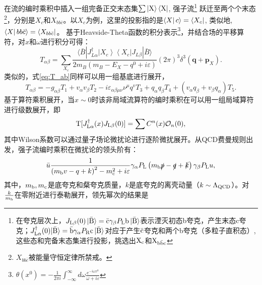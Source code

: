 在流的编时乘积中插入一组完备正交末态集$\mathrm{\sum\ket{X}\bra{X}}$, 强子流\footnote{在夸克层次上，$J_{\mathrm{L} \beta}(0)\ket{\mathrm{\bar{B}}}=\mathrm{\bar{c}} \gamma_\beta P_{\mathrm{L}} \mathrm{b\ket{\bar{B}}}$表示湮灭初态b夸克，产生末态c夸克；$J_{\mathrm{L} \alpha}^{\dagger}(0)\mathrm{\ket{\bar{B}}}=\mathrm{\bar{b}}\gamma_{\alpha}P_{\mathrm{R}}\mathrm{c\ket{\bar{B}}}$对应于产生$\mathrm{\bar{c}}$夸克和两个b夸克（多粒子直积态）,这些态和完备末态集进行投影，挑选出$\mathrm{X_{c}}$和$\mathrm{X_{b\bar{b}c}}$}
    跃迁至两个个末态\footnote{$X_{bb\bar{c}}$被能量守恒定律所禁戒。}，分别是$X_{c}$和$X_{bb\bar{c}}$。以$X_{c}$为例，这里的投影指的是$\bra{X}c\rangle=\bra{X_{c}}$, 类似地, $\bra{X}bb\bar{c}\rangle=\bra{X_{bb\bar{c}}}$。
    基于Heavside-Theta函数的积分表示\footnote{$\theta\left(x^0\right)=-\frac{1}{2 \pi i} \int_{-\infty}^{\infty} d \omega \frac{e^{-i \omega x^0}}{\omega+i \varepsilon}$}，并结合场的平移算符，对$x$和$\omega$进行积分可得：
    \begin{equation}
        T_{\alpha \beta}=\sum_{X_c} \frac{\langle\bar{B}| J_{L \alpha}^{\dagger}\left|X_c\right\rangle\left\langle X_c\right| J_{L \beta}|\bar{B}\rangle}{2 m_B\left(m_B-E_X-q^0+i \varepsilon\right)}(2 \pi)^3 \delta^3\left(\mathbf{q}+\mathbf{p}_X\right).
        \label{eq:T_ab}
    \end{equation}
类似的，式\eqref{eq:T_ab}同样可以用一组基底进行展开，
\begin{equation}
    T_{\alpha \beta}=-g_{\alpha \beta} T_1+v_\alpha v_\beta T_2-i \varepsilon_{\alpha \beta \mu \nu} \nu^\mu q^v T_3+q_\alpha q_\beta T_4+\left(v_\alpha q_\beta+v_\beta q_\alpha\right) T_5.
    \end{equation}
基于算符乘积展开，当$x\sim 0$时该非局域流算符的编时乘积在可以用一组局域算符进行级数展开，即
\begin{equation}
    \operatorname{T}[J_{\mathrm{L} \alpha}^{\dagger}(x) J_{\mathrm{L} \beta}(0)]=\sum C^n(x) \mathcal{O}_n(0),
\end{equation}
其中Wilson系数可以通过量子场论微扰论进行逐阶微扰展开。从QCD费曼规则出发，强子流编时乘积在微扰论的领头阶有：
\begin{equation}
    \bar{u} \frac{1}{\left(m_{\mathrm{b}} v - q + k\right)^2 - m_{\mathrm{c}}^2 + i \varepsilon} \gamma_{\alpha} P_{\mathrm{L}} \left(m_{\mathrm{b}} \slashed{p} - \slashed{q} + \slashed{k}\right) \gamma_{\beta} P_{\mathrm{L}} u,
\end{equation}
其中，$m_{\mathrm{b}}, m_{\mathrm{c}}$是底夸克和粲夸克质量，$k$是底夸克的离壳动量（$k\sim \Lambda_{\mathrm{QCD}}$）。对$\frac{k}{m_{\mathrm{b}}}$在零附近进行泰勒展开，领先幂次的结果是
